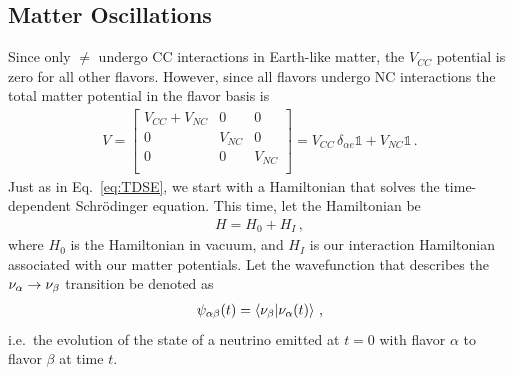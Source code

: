\subsection{Matter Oscillations}
Since only $\ne$ undergo CC interactions in Earth-like matter, the $V_{CC}$ potential is zero for all other flavors. 
However, since all flavors undergo NC interactions the total matter potential in the flavor basis is
\begin{align}\label{eq:V_matrix}
    V = \begin{bmatrix}
        V_{CC} + V_{NC} & 0 & 0 \\
        0 & V_{NC} & 0 \\
        0 & 0 & V_{NC} \\
    \end{bmatrix} = V_{CC}\, \delta_{\alpha e}\mathbb{1} + V_{NC}\mathbb{1}\,.
\end{align}
Just as in Eq.~\ref{eq:TDSE}, we start with a Hamiltonian that solves the time-dependent Schrödinger equation. This time, let the Hamiltonian be 
\begin{align}
    H = H_0 + H_{I}\,,
\end{align}
where $H_0$ is the Hamiltonian in vacuum, and $H_{I}$ is our interaction Hamiltonian associated with our matter potentials.
Let the wavefunction that describes the $\nu_\alpha \to \nu_\beta$ transition be denoted as
\begin{align}
    \psi_{\alpha\beta}(t) = \bra{\nu_\beta}\ket{\nu_\alpha (t)}\,,
\end{align}
i.e.~the evolution of the state of a neutrino emitted at $t =0$ with flavor $\alpha$ to flavor $\beta$ at time $t$.

